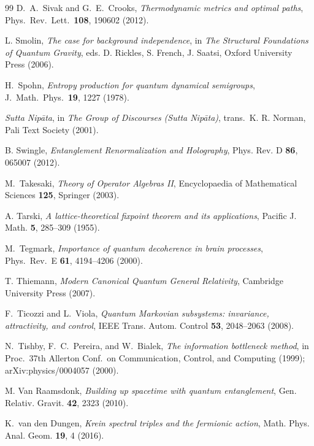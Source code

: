 \documentclass[12pt,a4paper,openany]{book}
\begin{document}
\begin{thebibliography}{99}
D.~A.~Sivak and G.~E.~Crooks,
\emph{Thermodynamic metrics and optimal paths},
Phys.\ Rev.\ Lett.\ \textbf{108}, 190602 (2012).

L. Smolin, \emph{The case for background independence}, in \emph{The Structural Foundations of Quantum Gravity}, eds. D. Rickles, S. French, J. Saatsi, Oxford University Press (2006).

H.~Spohn,
\emph{Entropy production for quantum dynamical semigroups},
J.\ Math.\ Phys.\ \textbf{19}, 1227 (1978).

\emph{Sutta Nipāta}, in \emph{The Group of Discourses (Sutta Nipāta)}, trans.\ K. R. Norman, Pali Text Society (2001).

B. Swingle, \emph{Entanglement Renormalization and Holography}, Phys. Rev. D \textbf{86}, 065007 (2012).

M.~Takesaki,
\emph{Theory of Operator Algebras II},
Encyclopaedia of Mathematical Sciences \textbf{125}, Springer (2003).

A. Tarski, \emph{A lattice-theoretical fixpoint theorem and its applications}, Pacific J. Math. \textbf{5}, 285--309 (1955).

M.~Tegmark,
\emph{Importance of quantum decoherence in brain processes},
Phys.\ Rev.\ E \textbf{61}, 4194--4206 (2000).


T. Thiemann, \emph{Modern Canonical Quantum General Relativity}, Cambridge University Press (2007).

F.~Ticozzi and L.~Viola, \emph{Quantum Markovian subsystems: invariance, attractivity, and control}, IEEE Trans. Autom. Control \textbf{53}, 2048--2063 (2008).

N.~Tishby, F.~C.~Pereira, and W.~Bialek,
\emph{The information bottleneck method},
in Proc.\ 37th Allerton Conf.\ on Communication, Control,
and Computing (1999); arXiv:physics/0004057 (2000).

M. Van Raamsdonk, \emph{Building up spacetime with quantum entanglement}, Gen. Relativ. Gravit. \textbf{42}, 2323 (2010).

K.~van den Dungen, \emph{Krein spectral triples and the fermionic action}, Math. Phys. Anal. Geom. \textbf{19}, 4 (2016).


\end{thebibliography}
\end{document}
